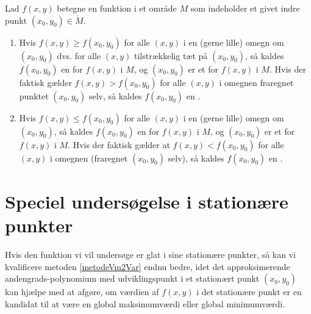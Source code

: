 \begin{definition} \label{defLokMaxMin2Var}
Lad $f(x,y)$ betegne en funktion i et område $M$  som indeholder et givet indre punkt $(x_{0}, y_{0}) \in \mathring{M}$.
\begin{enumerate}
\item  Hvis $f(x,y) \geq f(x_{0}, y_{0})$ for alle $(x, y)$ i en (gerne lille) omegn om $(x_{0}, y_{0})$ dvs. for alle $(x, y)$ tilstrækkelig tæt på $(x_{0}, y_{0})$, så kaldes $f(x_{0}, y_{0})$ en   for $f(x,y)$ i $M$, og $(x_{0}, y_{0})$ er et  for $f(x,y)$ i $M$. Hvis der faktisk gælder $f(x,y) > f(x_{0}, y_{0})$ for alle $(x, y)$ i omegnen fraregnet punktet $(x_{0}, y_{0})$ selv, så kaldes $f(x_{0}, y_{0})$ en .
\item Hvis $f(x,y) \leq f(x_{0}, y_{0})$ for alle $(x,y)$ i en (gerne lille) omegn om $(x_{0}, y_{0})$, så kaldes $f(x_{0}, y_{0})$ en   for $f(x,y)$ i $M$, og $(x_{0}, y_{0})$ er et  for $f(x,y)$ i $M$. Hvis der faktisk gælder at $f(x, y) < f(x_{0}, y_{0})$ for alle $(x,y)$ i omegnen (fraregnet $(x_{0}, y_{0})$ selv), så kaldes $f(x_{0}, y_{0})$ en .
\end{enumerate}
\end{definition}






\section{Speciel undersøgelse i stationære punkter} \label{secSpecStat}


Hvis den funktion vi vil undersøge er glat i sine stationære punkter, så kan vi kvalificere metoden \ref{metodeVm2Var} endnu bedre, idet det approksimerende andengrads-polynomium med udviklingspunkt i et stationært punkt $(x_{0}, y_{0})$ kan hjælpe med at afgøre, om værdien af $f(x,y)$ i det stationære punkt er en kandidat til at være en global maksimumværdi eller global minimumværdi. \\

